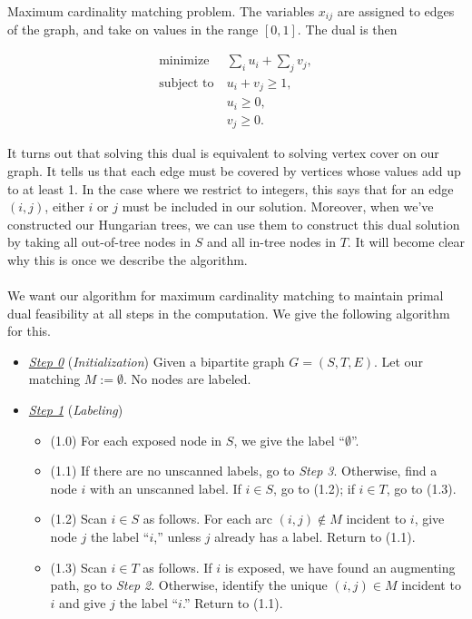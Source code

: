 \documentclass[11pt]{article}
\renewcommand{\'}{^{'}}
\begin{document}
\begin{section}{Maximum cardinality matching problem.}
The variables $x_{ij}$ are assigned to edges of the graph, and take on values in the 
range $[0,1]$. The dual is then 

\begin{align*}
	\text{minimize}\ &\sum_i u_i + \sum_j v_j,\\
	\text{subject to}\ &u_i + v_j \geq 1,\\
	                   &u_i \geq 0,\\
			   &v_j \geq 0.
\end{align*}

It turns out that solving this dual is equivalent to solving vertex cover on our graph. 
It tells us that each edge must be covered by vertices whose values add up to at least 1. 
In the case where we restrict to integers, this says that for an edge $(i,j)$, 
either $i$ or $j$ must be included in our solution. Moreover, when we've constructed our Hungarian 
trees, we can use them to construct this dual solution by taking all out-of-tree nodes in $S$ and 
all in-tree nodes in $T$. It will become clear why this is once we describe the algorithm.\\
\\
We want our algorithm for maximum cardinality matching to maintain primal dual feasibility at 
all steps in the computation. We give the following algorithm for this. 
\begin{itemize}
	\item \underline{\emph{Step 0}} (\emph{Initialization}) Given a bipartite 
		graph $G=(S,T,E)$. Let our matching $M := \emptyset$. No nodes are labeled.
	\item \underline{\emph{Step 1}} (\emph{Labeling})
		\begin{itemize}
			\item (1.0) For each exposed node in $S$, we give the label 
				``$\emptyset$''.
			\item (1.1) If there are no unscanned labels, go to \emph{Step 3}. 
				Otherwise, find a node $i$ with an unscanned label. If 
				$i\in S$, go to (1.2); if $i\in T$, go to (1.3).
			\item (1.2) Scan $i\in S$ as follows. For each arc $(i,j)\notin M$ 
				incident to $i$, give node $j$ the label ``$i$,'' unless 
				$j$ already has a label. Return to (1.1).
			\item (1.3) Scan $i\in T$ as follows. If $i$ is exposed, we have 
				found an augmenting path, go to \emph{Step 2}. Otherwise, 
				identify the unique $(i,j)\in M$ incident to $i$ and give 
				$j$ the label ``$i$.'' Return to (1.1).

\end{itemize}
\end{itemize}
\end{section}
\end{document}
